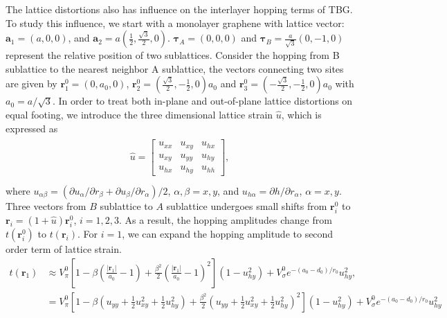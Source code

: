 \documentclass[aps,prx,10pt,twocolumn,superscriptaddress]{revtex4}
\begin{document}
\begin{widetext}
The lattice distortions also has influence on the interlayer hopping terms of TBG. To study this influence, we start with a monolayer graphene with lattice vector: $\textbf{a}_{1}\!=\!(a,0,0)$, and $\textbf{a}_{2}\!=\!a(\frac{1}{2},\frac{\sqrt{3}}{2},0)$. $\bm{\tau}_{A}\!=\!(0,0,0)$ and $\bm{\tau}_{B}\!=\!\frac{a}{\sqrt{3}}(0,-1,0)$ represent the relative position of two sublattices. Consider the hopping from B sublattice to the nearest neighbor  A sublattice, the vectors connecting two sites are given by $\textbf{r}^{0}_{1}\!=\!(0,a_{0},0)$, $\textbf{r}^{0}_{2}\!=\!(\frac{\sqrt{3}}{2},-\frac{1}{2},0)a_{0}$ and $\textbf{r}^{0}_{3}\!=\!(-\frac{\sqrt{3}}{2},-\frac{1}{2},0)a_{0}$ with $a_{0}\!=\!a/\sqrt{3}$. In order to treat both in-plane and out-of-plane lattice distortions on equal footing, we introduce the three dimensional lattice strain $\hat{u}$, which is expressed as
\begin{align}\label{strain}
\begin{split}
\hat{u}=\left[\begin{array}{ccc}
				u_{xx} & u_{xy} & u_{hx} \\
				u_{xy} & u_{yy} & u_{hy} \\
				u_{hx} & u_{hy} & u_{hh}
\end{array}\right],\\
\end{split}
\end{align}
 where $u_{\alpha\beta}\!=\!(\partial u_{\alpha}/\partial r_{\beta}+ \partial u_{\beta}/\partial r_{\alpha})/2$, $\alpha,\beta\!=\!x, y$, and $u_{h\alpha}\!=\!\partial h/\partial r_{\alpha}$, $\alpha\!=\!x, y$. Three vectors from $B$ sublattice to $A$ sublattice undergoes small shifts from $\textbf{r}^{0}_{i}$ to $\textbf{r}_{i}\!=\!(1+\hat{u})\textbf{r}^{0}_{i}$, $i=1,2,3$. As a result, the hopping amplitudes change from $t(\textbf{r}^{0}_{i})$ to $t(\textbf{r}_{i})$. For $i\!=\!1$, we can expand the hopping amplitude to second order term of lattice strain.
\allowdisplaybreaks
\begin{align}
t(\textbf{r}_{1})&\approx V^{0}_{\pi}\left[  1-\beta\left(\frac{\left|\textbf{r}_{1}\right|}{a_{0}}-1\right)+\frac{\beta^{2}}{2}\left(\frac{\left|\textbf{r}_{1}\right|}{a_{0}}-1\right)^{2} \right]\left(1-u^{2}_{hy}\right)+V^{0}_{\sigma}e^{-(a_{0}-d_{0})/r_{0}}u^{2}_{hy}, \nonumber\\
&=V^{0}_{\pi}\left[1-\beta\left(u_{yy}+\frac{1}{2}u^{2}_{xy}+\frac{1}{2}u^{2}_{hy}\right)+\frac{\beta^{2}}{2}\left(u_{yy}+\frac{1}{2}u^{2}_{xy}+\frac{1}{2}u^{2}_{hy}\right)^{2}\right]\left(1-u^{2}_{hy}\right)+V^{0}_{\sigma}e^{-(a_{0}-d_{0})/r_{0}}u^{2}_{hy}\nonumber\\

\end{align}
\end{widetext}
\end{document}
